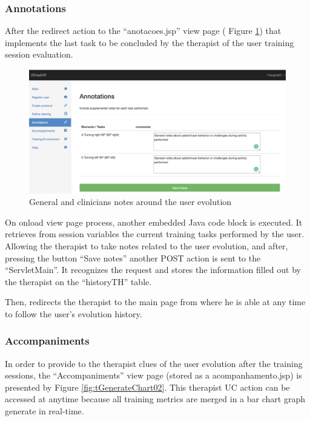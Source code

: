 \subsubsection{Annotations}

After the redirect action to the ``anotacoes.jsp'' view page ( Figure \ref{fig:tAnnotations}) that implements the last task to be concluded by the therapist of the user training session evaluation.

\begin{figure}[!hbt]
\begin{center}
\includegraphics[width=1\linewidth]{img/cap5/tAnnotations}
\caption{General and clinicians notes around the user evolution} \label{fig:tAnnotations}
\end{center}
\end{figure}

On onload view page process, another embedded Java code block is executed. It retrieves from session variables the current training tasks performed by the user. Allowing the therapist to take notes related to the user evolution, and after, pressing the button ``Save notes'' another POST action is sent to the ``ServletMain''. It recognizes the request and stores the information filled out by the therapist on the ``historyTH'' table. 

Then, redirects the therapist to the main page from where he is able at any time to follow the user's evolution history.  


\subsubsection{Accompaniments}

In order to provide to the therapist clues of the user evolution after the training sessions, the ``Accompaniments'' view page (stored as a acompanhamento.jsp) is presented by Figure \ref{fig:tGenerateChart02}. This therapist UC action can be accessed at anytime because all training metrics are merged in a bar chart graph generate in real-time.  

